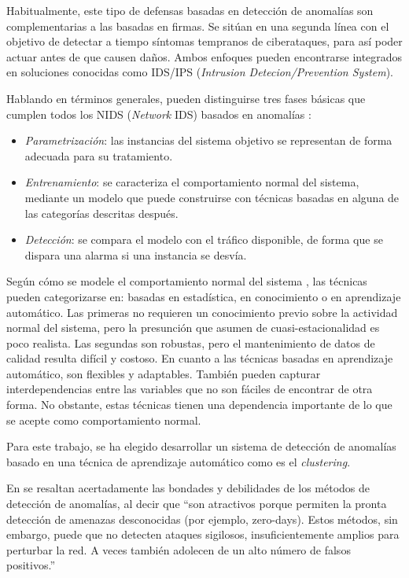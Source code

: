 Habitualmente, este tipo de defensas basadas en detección de anomalías son complementarias a las basadas en firmas.
Se sitúan en una segunda línea con el objetivo de detectar a tiempo síntomas tempranos de ciberataques, para así poder actuar antes de que causen daños.
Ambos enfoques pueden encontrarse integrados en soluciones conocidas como IDS/IPS (\emph{Intrusion Detecion/Prevention System}).

Hablando en términos generales, pueden distinguirse tres fases básicas que cumplen todos los NIDS (\emph{Network} IDS) basados en anomalías \cite{GarciaTeodoro_2009}:
\begin{itemize}
    \item \emph{Parametrización}: las instancias del sistema objetivo se representan de forma adecuada para su tratamiento.
    \item \emph{Entrenamiento}: se caracteriza el comportamiento normal del sistema, mediante un modelo que puede construirse con técnicas basadas en alguna de las categorías descritas después.
    \item \emph{Detección}: se compara el modelo con el tráfico disponible, de forma que se dispara una alarma si una instancia se desvía.
\end{itemize}

Según cómo se modele el comportamiento normal del sistema \cite{Lazaveric_2005}, las técnicas pueden categorizarse en: basadas en estadística, en conocimiento o en aprendizaje automático.
Las primeras no requieren un conocimiento previo sobre la actividad normal del sistema, pero la presunción que asumen de cuasi-estacionalidad es poco realista.
Las segundas son robustas, pero el mantenimiento de datos de calidad resulta difícil y costoso.
En cuanto a las técnicas basadas en aprendizaje automático, son flexibles y adaptables.
También pueden capturar interdependencias entre las variables que no son fáciles de encontrar de otra forma.
No obstante, estas técnicas tienen una dependencia importante de lo que se acepte como comportamiento normal.

Para este trabajo, se ha elegido desarrollar un sistema de detección de anomalías basado en una técnica de aprendizaje automático como es el \emph{clustering}.

En \cite{Alconzo_2019} se resaltan acertadamente las bondades y debilidades de los métodos de detección de anomalías, al decir que
``son atractivos porque permiten la pronta detección de amenazas desconocidas (por ejemplo, zero-days).
Estos métodos, sin embargo, puede que no detecten ataques sigilosos, insuficientemente amplios para perturbar la red.
A veces también adolecen de un alto número de falsos positivos.''

